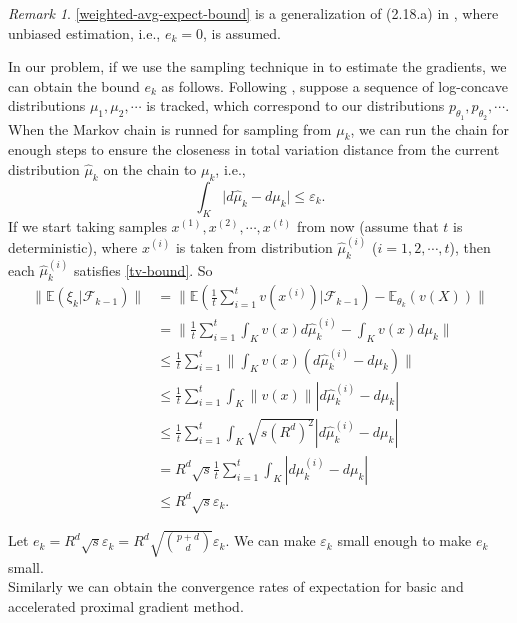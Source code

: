 \documentclass[psamsfonts]{article}
\theoremstyle{definition}
\theoremstyle{remark}
\newtheorem*{rem}{Remark}
\numberwithin{equation} {section}
\begin{document}
\begin{rem}
\eqref{weighted-avg-expect-bound} is a generalization of (2.18.a) in \cite{robust-sa}, where unbiased estimation, i.e., $e_k=0$, is assumed.
\end{rem}

In our problem, if we use the sampling technique in \cite{time-varying-sample} to estimate the gradients, we can obtain the bound $e_k$ as follows. Following \cite{time-varying-sample}, suppose a sequence of log-concave distributions $\mu_1, \mu_2, \cdots$ is tracked, which correspond to our distributions $p_{\theta_1}, p_{\theta_2}, \cdots$. When the Markov chain is runned for sampling from $\mu_k$, we can run the chain for enough steps to ensure the closeness in total variation distance from the current distribution $\hat{\mu}_k$ on the chain to $\mu_k$, i.e.,
\begin{equation}\label{tv-bound}
\int_{K}\big| d\hat{\mu}_k - d\mu_k\big| \le \varepsilon_k.
\end{equation}
If we start taking samples $x^{(1)}, x^{(2)}, \cdots, x^{(t)}$ from now (assume that $t$ is deterministic), where $x^{(i)}$ is taken from distribution $\hat{\mu}_k^{(i)}$ ($i=1,2,\cdots,t$), then each $\hat{\mu}_k^{(i)}$ satisfies \eqref{tv-bound}. So
\begin{equation}
\begin{aligned}
\|\mathbb E(\xi_k|\mathcal F_{k-1}) \| &= \| \mathbb E(\frac{1}{t}\sum_{i=1}^t v(x^{(i)})|\mathcal F_{k-1}) - \mathbb E_{\theta_k}(v(X)) \|\\
&= \|\frac{1}{t}\sum_{i=1}^t\int_K v(x)d\hat{\mu}_k^{(i)} - \int_K v(x)d\mu_k\|\\
&\le \frac{1}{t}\sum_{i=1}^t \|\int_K v(x)(d\hat{\mu}_k^{(i)} - d\mu_k)\|\\
&\le \frac{1}{t}\sum_{i=1}^t \int_K \|v(x)\| |d\hat{\mu}_k^{(i)} - d\mu_k|\\
&\le \frac{1}{t}\sum_{i=1}^t \int_K \sqrt{s(R^d)^2} |d\hat{\mu}_k^{(i)} - d\mu_k|\\
&= R^d\sqrt{s} \frac{1}{t}\sum_{i=1}^t \int_K|d\hat{\mu}_k^{(i)} - d\mu_k|\\
&\le R^d\sqrt{s}\varepsilon_k.
\end{aligned}
\end{equation}

Let $e_k = R^d\sqrt{s}\varepsilon_k = R^d\sqrt{p+d\choose d}\varepsilon_k$. We can make $\varepsilon_k$ small enough to make $e_k$ small.\\

Similarly we can obtain the convergence rates of expectation for basic and accelerated proximal gradient method.
\end{document}
